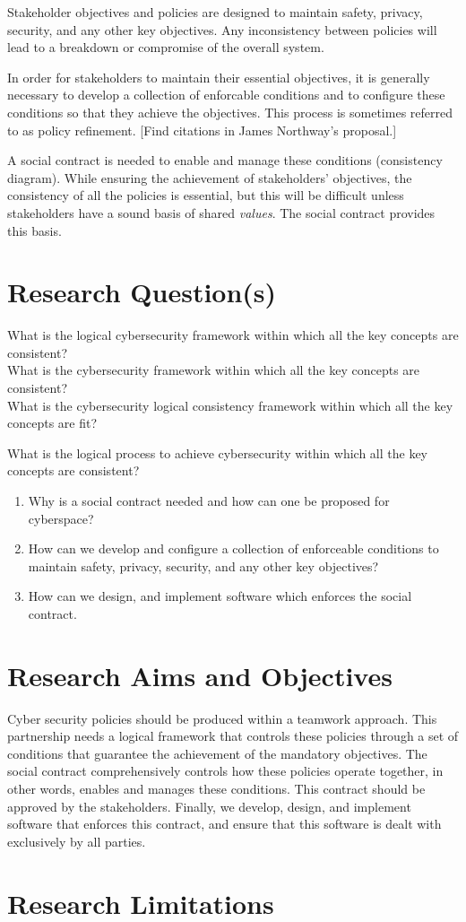 Stakeholder objectives and policies are designed to maintain safety, privacy, security,
and any other key objectives. Any inconsistency between policies will lead
to a breakdown or compromise of the overall system.

In order for stakeholders to maintain their essential objectives, it is
generally necessary to develop a collection of enforcable conditions and to configure these conditions so that they achieve the objectives. This process is sometimes referred to as policy refinement. [Find citations in James Northway's
proposal.]

A social contract is needed to enable and manage these conditions (consistency diagram).  While ensuring the achievement of stakeholders’ objectives, the consistency of all the policies is essential, but this will be difficult unless stakeholders have a sound basis of shared {\em values}. The social contract provides this basis.
\section{Research Question(s)}
\if
What is the logical cybersecurity framework within which all the key concepts are consistent?\\
What is the cybersecurity framework within which all the key concepts are consistent?\\
What is the cybersecurity logical consistency framework within which all the key concepts are fit?\\
\fi

What is the logical process to achieve cybersecurity within which all the key concepts are consistent?
\begin{enumerate}
\item Why is a social contract needed and how can one be proposed for cyberspace?
\item How can we develop and configure a collection of enforceable conditions to maintain safety, privacy, security, and any other key objectives?
\item How can we design, and implement software which enforces the social contract.%
\end{enumerate}



\section{Research Aims and Objectives}
Cyber security policies should be produced within a teamwork approach.  This partnership needs a logical framework that controls these policies through a set of conditions that guarantee the achievement of the mandatory objectives.  The social contract comprehensively controls how these policies operate together, in other words, enables and manages these conditions.  This contract should be approved by the stakeholders. Finally, we develop, design, and implement software that enforces this contract, and ensure that this software is dealt with exclusively by all parties.

\section{Research Limitations}
